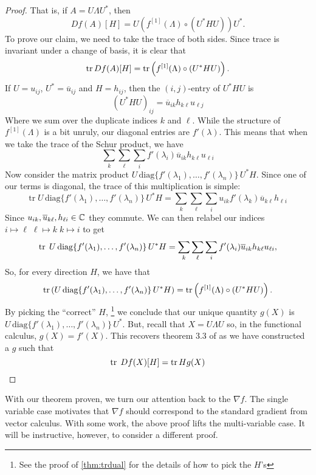 \begin{proof}
That is, if $A = U   \Lambda U ^{*} $, then
\[
  Df(A)[H] = U \left( f ^{[1]} (\Lambda) \circ (U ^{* } H U) \right)U ^{*}.
\]
%
To prove our claim, we need to take the trace of both sides. Since trace is
invariant under a change of basis, it is clear that
\[
  \operatorname{tr} Df(A)[H] = \operatorname{tr} \left( f ^{[1]} (\Lambda) \circ (U ^{* } H U) \right).
\]
If $U = u_{ij}$, $U ^{*} = \overline{u}_{ij}$ and $H = h_{ij}$, then the
$(i,j)$-entry of $U ^{*}HU$ is
\[
  {(U ^{* } H U)}_{ij} = \overline{u}_{ik}h_{k\ell}u_{\ell j}
\]
Where we sum over the duplicate indices $k$ and $\ell$. While the structure of
$f ^{[1]} (\Lambda)$ is a bit unruly, our diagonal entries are $f'(\lambda)$.
This means that when we take the trace of the Schur product, we have
\[
 \sum_k\sum_\ell \sum_i f'(\lambda_i)\overline{u}_{ik}h_{k\ell}u_{\ell i}
\]
Now consider the matrix product
$U\, \text{diag} \{f'(\lambda_1), \dots ,f'(\lambda_n)\} \,U ^{*} H $. Since one of our terms
is diagonal, the trace of this multiplication is simple:
\[
  \text{tr}\; U \,\text{diag} \{f'(\lambda_1), \dots ,f'(\lambda_n)\}\, U ^{*} H
  = \sum_k\sum_\ell\sum_i  u_{ik}f'(\lambda_k) \overline{u}_{k \ell} h_{\ell i}
\]
Since \(u_{ik}, \overline{u}_{k\ell}, h_{\ell i} \in \mathbb{C} \) they commute. We can
then relabel our indices
$i \mapsto \ell\; \ell \mapsto k \; k \mapsto i $ to get
\[
  \operatorname{tr}\; U \,\text{diag} \{f'(\lambda_1), \dots ,f'(\lambda_n)\}\, U ^{*} H
  = \sum_k\sum_\ell \sum_i f'(\lambda_i) \overline{u}_{i k} h_{k \ell}u_{\ell i},
\]
So, for every direction \(H\), we have that
\[
  \operatorname{tr} \left( U\, \text{diag} \{f'(\lambda_1), \dots ,f'(\lambda_n)\} \,U ^{*} H\right) =
  \operatorname{tr} \left( f ^{[1]} (\Lambda) \circ (U ^{* } H U) \right).
\]
By picking the ``correct'' \(H\),
\footnote{See the proof of \ref{thm:trdual} for the details of how to pick the
  \(H\)'s}
we conclude that our unique quantity \(g(X)\) is
\(U\, \text{diag} \{f'(\lambda_1), \dots ,f'(\lambda_n)\} \,U ^{*} \). But,
recall that \(X=U\Lambda U\) so, in the functional calculus, $g(X) = f'(X)$.
This recovers theorem 3.3 of \cite{pascoeTrace2020} as we have constructed a
\(g\) such that
\[
  \operatorname{tr} \; Df(X)[H] = \operatorname{tr} H g(X)
\]
\end{proof}

With our theorem proven, we turn our attention back to the \(\nabla f\). The
single variable case motivates that \(\nabla f\) should correspond to the
standard gradient from vector calculus. With some work, the above proof lifts
the multi-variable case. It will be instructive, however, to consider a
different proof.

